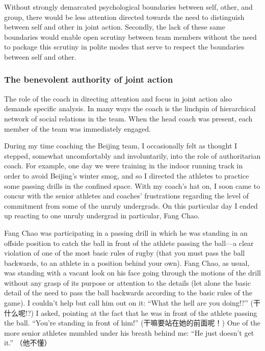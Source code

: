\begin{CJK}{UTF8}{gbsn}
Without strongly demarcated psychological boundaries between self, other, and group, there would be less attention directed towards the need to distinguish between self and other in joint action.  Secondly, the lack of these same boundaries would enable open scrutiny between team members without the need to package this scrutiny in polite modes that serve to respect the boundaries between self and other.

\subsubsection{The benevolent authority of joint action}

The role of the coach in directing attention and focus in joint action also demands specific analysis.  In many ways the coach is the linchpin of hierarchical network of social relations in the team.  When the head coach was present, each member of the team was immediately engaged.

During my time coaching the Beijing team, I occasionally felt as thought I stepped, somewhat uncomfortably and involuntarily, into the role of authoritarian coach.  For example, one day we were training in the indoor running track in order to avoid Beijing's winter smog, and so I directed the athletes to practice some passing drills in the confined space. With my coach's hat on, I soon came to concur with the senior athletes and coaches' frustrations regarding the level of commitment from some of the unruly undergrads.  On this particular day I ended up reacting to one unruly undergrad in particular, Fang Chao.

Fang Chao was participating in a passing drill in which he was standing in an offside position to catch the ball in front of the athlete passing the ball---a clear violation of one of the most basic rules of rugby (that you must pass the ball backwards, to an athlete in a position behind your own).  Fang Chao, as usual, was standing with a vacant look on his face going through the motions of the drill without any grasp of its purpose or attention to the details (let alone the basic detail of the need to pass the ball backwards according to the basic rules of the game).  I couldn't help but call him out on it: ``What the hell are you doing!?'' (干什么呢!?) I asked, pointing at the fact that he was in front of the athlete passing the ball.  ``You're standing in front of him!'' (干嘛要站在她的前面呢！) One of the more senior athletes mumbled under his breath behind me: ``He just doesn't get it.'' （他不懂）


\end{CJK}
